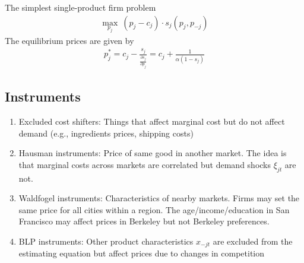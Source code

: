 \documentclass[11pt]{elegantbook}
\begin{document}
\begin{example}
    The simplest single-product firm problem
    \begin{equation}
        \begin{aligned}
            \max_{p_j}\ (p_j-c_j)\cdot s_j(p_j,p_{-j})
        \end{aligned}
        \nonumber
    \end{equation}
    The equilibrium prices are given by
    \begin{equation}
        \begin{aligned}
            p_j^*=c_j-\frac{s_j}{\frac{\partial s_j}{\partial p_j}}=c_j+\frac{1}{\alpha(1-s_j)}
        \end{aligned}
        \nonumber
    \end{equation}
\end{example}

\subsection{Instruments}
\begin{enumerate}
    \item Excluded cost shifters:
    \subitem Things that affect marginal cost but do not affect demand (e.g., ingredients prices, shipping costs)
    \item Hausman instruments:
    \subitem Price of same good in another market. The idea is that marginal costs across markets are correlated but demand shocks $\xi_{jt}$ are not.
    \item  Waldfogel instruments:
    \subitem Characteristics of nearby markets. Firms may set the same price for all cities within a region. The
    age/income/education in San Francisco may affect prices in Berkeley but not Berkeley preferences.
    \item BLP instruments:
    \subitem Other product characteristics $x_{-jt}$ are excluded from the estimating equation but affect prices due
    to changes in competition
\end{enumerate}
\end{document}
